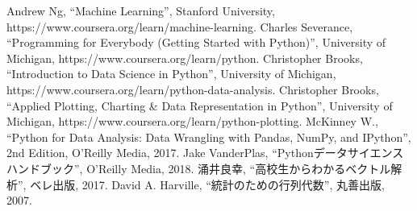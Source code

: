 \begin{thebibliography}{99}
 Andrew Ng, ``Machine Learning'', Stanford University, https://www.coursera.org/learn/machine-learning.
 Charles Severance, ``Programming for Everybody (Getting Started with Python)'', University of Michigan, https://www.coursera.org/learn/python.
 Christopher Brooks, ``Introduction to Data Science in Python'', University of Michigan, https://www.coursera.org/learn/python-data-analysis.
 Christopher Brooks, ``Applied Plotting, Charting \& Data Representation in Python'', University of Michigan, https://www.coursera.org/learn/python-plotting.
 McKinney W., ``Python for Data Analysis: Data Wrangling with Pandas, NumPy, and IPython'', 2nd Edition, O'Reilly Media, 2017.
 Jake VanderPlas, ``Pythonデータサイエンスハンドブック'', O'Reilly Media, 2018.
 涌井良幸, ``高校生からわかるベクトル解析'', ベレ出版, 2017.
 David A. Harville, ``統計のための行列代数'', 丸善出版, 2007.
\end{thebibliography}